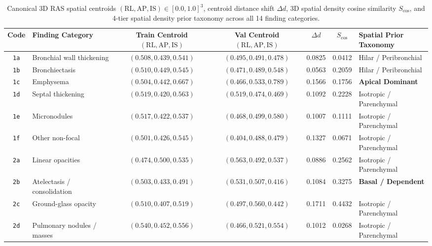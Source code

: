 \documentclass[11pt,a4paper]{article}
\begin{document}
\begin{table}[htbp]
\centering
\caption{Canonical 3D RAS spatial centroids $(\text{RL}, \text{AP}, \text{IS}) \in [0.0, 1.0]^3$, centroid distance shift $\Delta d$, 3D spatial density cosine similarity $S_{\text{cos}}$, and 4-tier spatial density prior taxonomy across all 14 finding categories.}
\label{tab:spatial_centroids}
\footnotesize
\setlength{\tabcolsep}{3pt}
\begin{tabularx}{\linewidth}{c >{\raggedright\arraybackslash}X c c c c >{\raggedright\arraybackslash}X}
\toprule
\textbf{Code} & \textbf{Finding Category} & \makecell{\textbf{Train Centroid}\\\textbf{$(\text{RL}, \text{AP}, \text{IS})$}} & \makecell{\textbf{Val Centroid}\\\textbf{$(\text{RL}, \text{AP}, \text{IS})$}} & $\Delta d$ & $S_{\text{cos}}$ & \makecell{\textbf{Spatial Prior}\\\textbf{Taxonomy}} \\
\midrule
\texttt{1a} & Bronchial wall thickening & $(0.508, 0.439, 0.541)$ & $(0.495, 0.491, 0.478)$ & 0.0825 & 0.0412 & Hilar / Peribronchial \\
\texttt{1b} & Bronchiectasis & $(0.510, 0.449, 0.545)$ & $(0.471, 0.489, 0.548)$ & 0.0563 & 0.2059 & Hilar / Peribronchial \\
\texttt{1c} & Emphysema & $(0.504, 0.442, 0.667)$ & $(0.466, 0.533, 0.789)$ & 0.1566 & 0.1756 & \textbf{Apical Dominant} \\
\texttt{1d} & Septal thickening & $(0.519, 0.420, 0.563)$ & $(0.519, 0.474, 0.469)$ & 0.1092 & 0.2228 & Isotropic / Parenchymal \\
\texttt{1e} & Micronodules & $(0.517, 0.422, 0.537)$ & $(0.468, 0.499, 0.580)$ & 0.1007 & 0.1111 & Isotropic / Parenchymal \\
\texttt{1f} & Other non-focal & $(0.501, 0.426, 0.545)$ & $(0.404, 0.488, 0.479)$ & 0.1327 & 0.0671 & Isotropic / Parenchymal \\
\texttt{2a} & Linear opacities & $(0.474, 0.500, 0.535)$ & $(0.563, 0.492, 0.537)$ & 0.0886 & 0.2562 & Isotropic / Parenchymal \\
\texttt{2b} & Atelectasis / consolidation & $(0.503, 0.433, 0.491)$ & $(0.531, 0.507, 0.416)$ & 0.1084 & 0.3275 & \textbf{Basal / Dependent} \\
\texttt{2c} & Ground-glass opacity & $(0.510, 0.407, 0.519)$ & $(0.497, 0.560, 0.442)$ & 0.1711 & 0.4432 & Isotropic / Parenchymal \\
\texttt{2d} & Pulmonary nodules / masses & $(0.540, 0.452, 0.556)$ & $(0.466, 0.521, 0.554)$ & 0.1012 & 0.0268 & Isotropic / Parenchymal \\

\end{tabularx}
\end{table}
\end{document}

